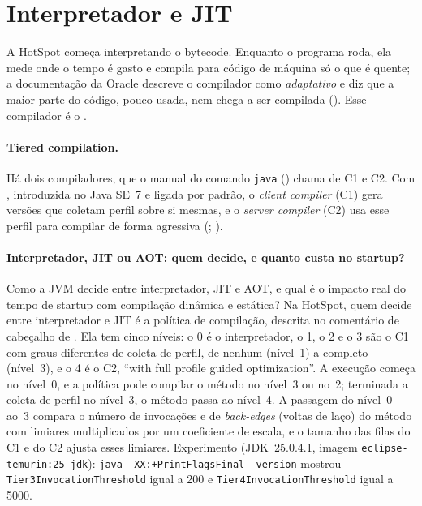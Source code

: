 \section{Interpretador e JIT}
\label{sec:jit}

A HotSpot começa interpretando o bytecode. Enquanto o programa roda, ela
mede onde o tempo é gasto e compila para código de máquina só o que é
quente; a documentação da Oracle descreve o compilador como
\emph{adaptativo} e diz que a maior parte do código, pouco usada, nem
chega a ser compilada (). Esse compilador é o
.

\paragraph{Tiered compilation.}
Há dois compiladores, que o manual do comando \texttt{java}
() chama de C1 e C2. Com
, introduzida no Java SE~7 e ligada por padrão, o
\emph{client compiler} (C1) gera versões que coletam perfil sobre si
mesmas, e o \emph{server compiler} (C2) usa esse perfil para compilar de
forma agressiva (;
).

\paragraph{Interpretador, JIT ou AOT: quem decide, e quanto custa no startup?}
Como a JVM decide entre interpretador, JIT e AOT, e qual é o impacto real
do tempo de startup com compilação dinâmica e estática? Na HotSpot, quem
decide entre interpretador e JIT é a política de compilação, descrita no
comentário de cabeçalho de . Ela
tem cinco níveis: o 0 é o interpretador, o 1, o 2 e o 3 são o C1 com
graus diferentes de coleta de perfil, de nenhum (nível~1) a completo
(nível~3), e o 4 é o C2, \enquote{with full
profile guided optimization}. A execução começa no nível~0, e a política
pode compilar o método no nível~3 ou no~2; terminada a coleta de perfil
no nível~3, o método passa ao nível~4. A passagem do nível~0 ao~3 compara
o número de invocações e de \emph{back-edges} (voltas de laço) do método
com limiares multiplicados por um coeficiente de escala, e o tamanho das
filas do C1 e do C2 ajusta esses limiares. Experimento (JDK~25.0.4.1,
imagem \texttt{eclipse-temurin:25-jdk}): \texttt{java
-XX:+PrintFlagsFinal -version} mostrou \texttt{Tier3InvocationThreshold}
igual a 200 e \texttt{Tier4InvocationThreshold} igual a 5000.


